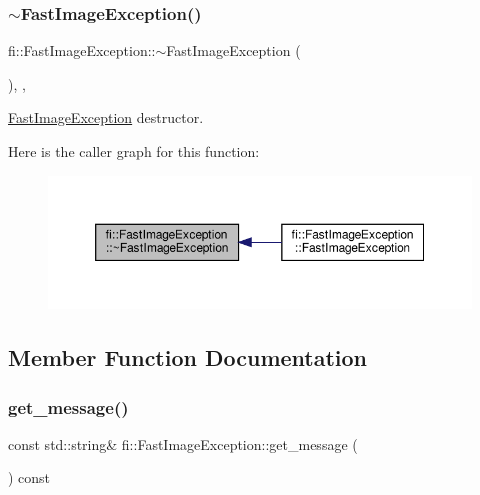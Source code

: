 \subsubsection{\texorpdfstring{$\sim$\+Fast\+Image\+Exception()}{~FastImageException()}}
{\footnotesize\ttfamily fi\+::\+Fast\+Image\+Exception\+::$\sim$\+Fast\+Image\+Exception (\begin{DoxyParamCaption}{ }\end{DoxyParamCaption})\hspace{0.3cm}{\ttfamily [override]}, {\ttfamily [default]}, {\ttfamily [noexcept]}}



\hyperlink{classfi_1_1FastImageException}{Fast\+Image\+Exception} destructor. 

Here is the caller graph for this function\+:
\nopagebreak
\begin{figure}[H]
\begin{center}
\leavevmode
\includegraphics[width=350pt]{d5/d1c/classfi_1_1FastImageException_aee6254b5bad18046029c39f4d7688463_icgraph}
\end{center}
\end{figure}


\subsection{Member Function Documentation}
\mbox{\label{classfi_1_1FastImageException_afea494cd1b0bfe73da9eb6865228aec3}} 
\subsubsection{\texorpdfstring{get\+\_\+message()}{get\_message()}}
{\footnotesize\ttfamily const std\+::string\& fi\+::\+Fast\+Image\+Exception\+::get\+\_\+message (\begin{DoxyParamCaption}{ }\end{DoxyParamCaption}) const\hspace{0.3cm}{\ttfamily [inline]}}



